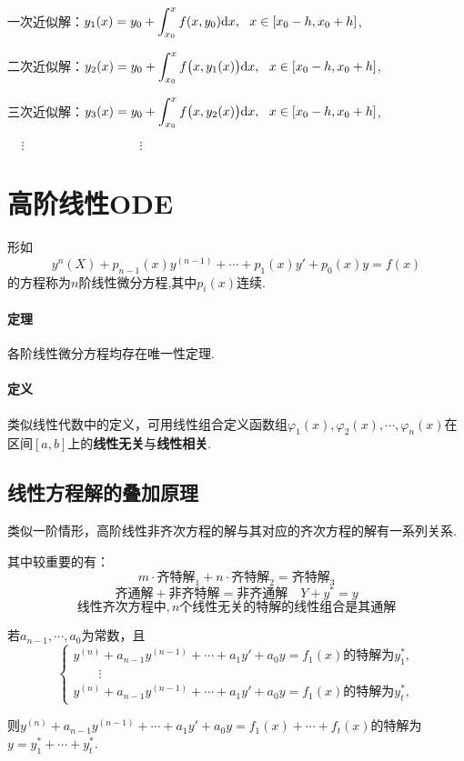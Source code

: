 \documentclass[UTF8]{ctexart}
\begin{document}
一次近似解：$\displaystyle{y_1(x)}={y_0}+\int_{x_0}^x f(x,{y_0}){\rm d}x,\ \ x\in[x_0-h,x_0+h]$,

二次近似解：$\displaystyle{y_2(x)}={y_0}+\int_{x_0}^x f\big(x,{y_1(x)}\big){\rm d}x,\ \ x\in[x_0-h,x_0+h]$,

三次近似解：$\displaystyle{y_3(x)}={y_0}+\int_{x_0}^x f\big(x,{y_2(x)}\big){\rm d}x,\ \ x\in[x_0-h,x_0+h]$,

$\ \ \ \ \ \vdots \ \ \ \ \ \ \ \ \ \ \ \ \ \ \ \ \ \ \ \ \ \ \ \ \ \ \ \ \ \ \ \ \ \ \ \ \ \ \ \ \ \vdots$

\section{高阶线性ODE}
形如
$$y^{n}(X)+p_{n-1}(x)y^{(n-1)}+\cdots+p_1(x)y'+p_0(x)y=f(x)$$
的方程称为$n$阶线性微分方程,其中$p_i(x)$连续.

\paragraph*{定理}各阶线性微分方程均存在唯一性定理.

\paragraph*{定义}类似线性代数中的定义，可用线性组合定义函数组$\varphi_1(x),\varphi_2(x),\cdots,\varphi_n(x)$在区间$[a,b]$上的\songti\textbf{线性无关}与\songti\textbf{线性相关}.

\subsection{线性方程解的叠加原理}
类似一阶情形，高阶线性非齐次方程的解与其对应的齐次方程的解有一系列关系.

其中较重要的有：
$$m\cdot\texttt{齐特解}_1+n\cdot\texttt{齐特解}_2=\texttt{齐特解}_3$$
$$\texttt{齐通解}+\texttt{非齐特解}=\texttt{非齐通解}\quad\boxed{Y+y^\ast=y}$$
$$\texttt{线性齐次方程中},n\texttt{个线性无关的特解的线性组合是其通解}$$

若$a_{n-1},\cdots,a_0$为常数，且$$\begin{cases}
    y^{(n)}+a_{n-1}y^{(n-1)}+\cdots+a_1y'+a_0y=f_1(x)\text{的特解为}y_1^\ast,\\
    \qquad\vdots\\ 
    y^{(n)}+a_{n-1}y^{(n-1)}+\cdots+a_1y'+a_0y=f_1(x)\text{的特解为}y_t^\ast,
\end{cases}$$

则$y^{(n)}+a_{n-1}y^{(n-1)}+\cdots+a_1y'+a_0y=f_1(x)+\cdots+f_t(x)$的特解为$y=y_1^\ast+\cdots+y_t^\ast$.
\end{document}
